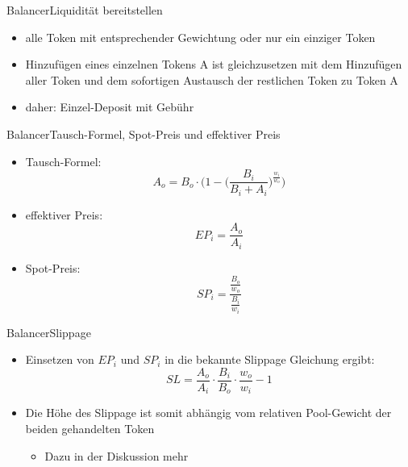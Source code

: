 \documentclass{beamer}
\begin{document}
\begin{frame}{Balancer}{Liquidität bereitstellen}
\begin{itemize}
\item<1->{alle Token mit entsprechender Gewichtung oder nur ein einziger Token}
\item<2->{Hinzufügen eines einzelnen Tokens A ist gleichzusetzen mit dem Hinzufügen aller Token und dem sofortigen Austausch der restlichen Token zu Token A}
\item<3->{daher: Einzel-Deposit mit Gebühr}
\end{itemize}
\end{frame}

\begin{frame}{Balancer}{Tausch-Formel, Spot-Preis und effektiver Preis}
\begin{itemize}
 \item{Tausch-Formel:
 \begin{equation*}
  A_{o} = B_{o} \cdot \Biggl(1-\biggl(\dfrac{B_{i}}{B_{i}+ A_{i}}\biggr)^{\tfrac{w_{i}}{w_{o}}}\Biggr)
 \end{equation*}
 }
 \item{effektiver Preis:
 \begin{equation*}
 EP_{i}=\dfrac{A_{o}}{A_{i}}
 \end{equation*}
 }
 \item{Spot-Preis:
 \begin{equation*}
 SP_{i} = \dfrac{\frac{B_{o}}{w_{o}}}{\frac{B_{i}}{w_{i}}}
 \end{equation*}
 }
\end{itemize}
\end{frame}

\begin{frame}{Balancer}{Slippage}
\begin{itemize}
\item<1->{Einsetzen von $EP_{i}$ und $SP_{i}$ in die bekannte Slippage Gleichung ergibt:
\begin{equation*}
	SL= \dfrac{A_{o}}{A_{i}} \cdot \dfrac{B_{i}}{B_{o}} \cdot \dfrac{w_{o}}{w_{i}} -1
\end{equation*}
}
\item<1->{Die Höhe des Slippage ist somit abhängig vom relativen Pool-Gewicht der beiden gehandelten Token}
\begin{itemize}
\item{Dazu in der Diskussion mehr}
\end{itemize}
\end{itemize}
\end{frame}
\end{document}
